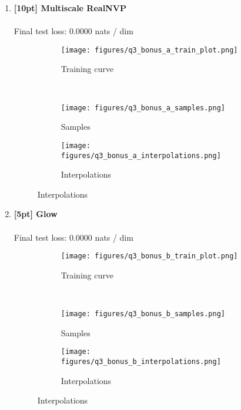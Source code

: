 \documentclass{article}
\begin{document}
\newpage
{}
\begin{enumerate}

\item {\bf [10pt] Multiscale RealNVP} \\\\
Final test loss: 0.0000  nats / dim
\begin{figure}[H]
    \centering
    \begin{subfigure}{0.45\textwidth}
        \centering
        \texttt{[image: figures/q3\_bonus\_a\_train\_plot.png]}
        \caption{Training curve}
    \end{subfigure}
    \\
    \begin{subfigure}{0.48\textwidth}
        \centering
        \texttt{[image: figures/q3\_bonus\_a\_samples.png]}
        \caption{Samples}
    \end{subfigure}
    \begin{subfigure}{0.48\textwidth}
        \centering
        \texttt{[image: figures/q3\_bonus\_a\_interpolations.png]}
        \caption{Interpolations}
    \end{subfigure}
\end{figure}

\newpage
\item {\bf [5pt] Glow} \\\\
Final test loss: 0.0000  nats / dim
\begin{figure}[H]
    \centering
    \begin{subfigure}{0.45\textwidth}
        \centering
        \texttt{[image: figures/q3\_bonus\_b\_train\_plot.png]}
        \caption{Training curve}
    \end{subfigure}
    \\
    \begin{subfigure}{0.48\textwidth}
        \centering
        \texttt{[image: figures/q3\_bonus\_b\_samples.png]}
        \caption{Samples}
    \end{subfigure}
    \begin{subfigure}{0.48\textwidth}
        \centering
        \texttt{[image: figures/q3\_bonus\_b\_interpolations.png]}
        \caption{Interpolations}
    \end{subfigure}
\end{figure}
\end{enumerate}
\end{document}
